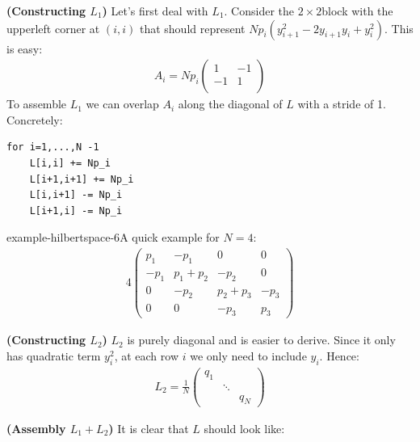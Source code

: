 \textbf{(Constructing $L_1$)}
Let's first deal with $L_1$. Consider the $2\times 2$block with the upperleft corner at $(i,i)$ that should
represent $Np_i(y_{i+1}^2 -2y_{i+1}y_i +y_i^2)$. This is easy:
\begin{equation}
\begin{aligned}
A_i=Np_i\begin{pmatrix}
1 & -1\\
-1 & 1 \\
\end{pmatrix}
\end{aligned}
\end{equation}
To assemble $L_1$ we can overlap $A_i$ along the diagonal of $L$ with a stride of 1. Concretely:

\begin{mystcodebox}
\begin{verbatim}
for i=1,...,N -1
    L[i,i] += Np_i
    L[i+1,i+1] += Np_i
    L[i,i+1] -= Np_i 
    L[i+1,i] -= Np_i
\end{verbatim}

\end{mystcodebox}
\begin{mystthmexample}{}{example-hilbertspace-6}A quick example for $N=4$:
\begin{equation}
\begin{aligned}
4\begin{pmatrix}
p_1 & -p_1 & 0 & 0 \\
-p_1 & p_1+p_2 & -p_2 &0 \\
0 & -p_2 & p_2+p_3 & -p_3 \\
0 &  0 & -p_3  & p_3
\end{pmatrix}
\end{aligned}
\end{equation}

\end{mystthmexample}
\textbf{(Constructing $L_2$)}
$L_2$ is purely diagonal and is easier to derive. Since it only has quadratic term $y_i^2$, at each row $i$ we only need to include $y_i$. Hence:
\begin{equation}
\begin{aligned}
L_2 = \frac{1}{N}\begin{pmatrix}q_1 & & \\
& \ddots & \\
& & q_N
\end{pmatrix}
\end{aligned}
\end{equation}

\textbf{(Assembly $L_1+L_2$)}
It is clear that $L$ should look like:

